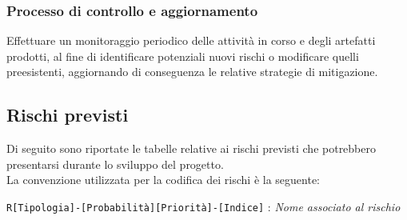 \documentclass{article}
\begin{document}
\subsubsection{Processo di controllo e aggiornamento}
Effettuare un monitoraggio periodico delle attività in corso e degli artefatti prodotti, al fine di identificare potenziali nuovi rischi o modificare quelli preesistenti, aggiornando di conseguenza le relative strategie di mitigazione.

\subsection{Rischi previsti}
Di seguito sono riportate le tabelle relative ai rischi previsti che potrebbero presentarsi durante lo sviluppo del progetto. \\
La convenzione utilizzata per la codifica dei rischi è la seguente: 
\begin{center}
    \texttt{R[Tipologia]-[Probabilità][Priorità]-[Indice]} : \textit{Nome associato al rischio}
\end{center} 
\newpage
\end{document}
